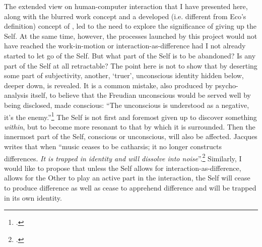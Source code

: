 The extended view on human-computer interaction that I have presented here, along with the blurred work concept and a developed (i.e. different from Eco's definition) concept of , led to the need to explore the significance of giving up the Self.  At the same time, however, the processes launched by this project would not have reached the work-in-motion or interaction-as-difference had I not already started to let go of the Self. But what part of the Self is to be abandoned? Is any part of the Self at all retractable? The point here is not to show that by deserting some part of subjectivity, another, `truer', unconscious identity hidden below, deeper down, is revealed. It is a common mistake, also produced by psycho-analysis itself, to believe that the Freudian unconscious would be served well by being disclosed, made conscious: ``The unconscious is understood as a negative, it's the enemy.''\footcites[][57]{deleuze77}[See also][128-56]{bateson72} The Self is not first and foremost given up to discover something \emph{within}, but to become more resonant to that by which it is surrounded. Then the innermost part of the Self, conscious or unconscious, will also be affected. Jacques \citeauthor{attali85} writes that when ``music ceases to be catharsis; it no longer constructs differences. \emph{It is trapped in identity and will dissolve into noise}''.\footcite[45]{attali85} Similarly, I would like to propose that unless the Self allows for interaction-as-difference, allows for the Other to play an active part in the interaction, the Self will cease to produce difference as well as cease to apprehend difference and will be trapped in its own identity.

